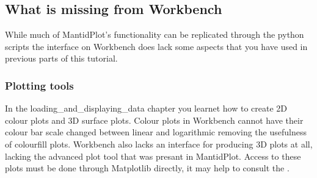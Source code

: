 \documentclass[letterpaper,10pt,english,openany]{sphinxmanual}
\begin{document}
\subsection{What is missing from Workbench}
\label{\detokenize{mantid_basic_course/using_workbench/04_What_is_missing:what-is-missing-from-workbench}}\label{\detokenize{mantid_basic_course/using_workbench/04_What_is_missing:what-is-missing}}\label{\detokenize{mantid_basic_course/using_workbench/04_What_is_missing::doc}}
While much of MantidPlot’s functionality can be replicated through the python scripts the interface on Workbench does lack some aspects that you have
used in previous parts of this tutorial.


\subsubsection{Plotting tools}
\label{\detokenize{mantid_basic_course/using_workbench/04_What_is_missing:plotting-tools}}
In the loading\_and\_displaying\_data chapter you learnet how to create 2D colour plots and 3D surface plots. Colour plots in Workbench cannot have
their colour bar scale changed between linear and logarithmic removing the usefulness of colourfill plots.
Workbench also lacks an interface for producing 3D plots at all, lacking the advanced plot tool that was presant in MantidPlot.
Access to these plots must be done through Matplotlib directly, it may help to consult the .
\end{document}
